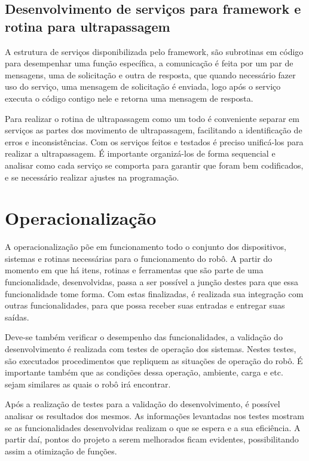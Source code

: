 \subsection{Desenvolvimento de serviços para framework e rotina para ultrapassagem}
\label{ssec:serv_ultr}
A estrutura de serviços disponibilizada pelo framework, são subrotinas em código para desempenhar uma função específica, a comunicação é feita por um par de mensagens, uma de solicitação e outra de resposta, que quando necessário fazer uso do serviço, uma mensagem de solicitação é enviada, logo após o serviço executa o código contigo nele e retorna uma mensagem de resposta. 

Para realizar o rotina de ultrapassagem como um todo é conveniente separar em serviços as partes dos movimento de ultrapassagem, facilitando a identificação de erros e inconsistências. Com os serviços feitos e testados é preciso unificá-los para realizar a ultrapassagem. É importante organizá-los de forma sequencial e analisar como cada serviço se comporta para garantir que foram bem codificados, e se necessário realizar ajustes na programação. 

\section{Operacionalização}
\label{sec:operal}
A operacionalização põe em funcionamento todo o conjunto dos dispositivos, sistemas e rotinas necessárias para o funcionamento do robô. A partir do momento em que há itens, rotinas e ferramentas que são parte de uma funcionalidade, desenvolvidas, passa a ser possível a junção destes para que essa funcionalidade tome forma. Com estas finalizadas, é realizada sua integração com outras funcionalidades, para que possa receber suas entradas e entregar suas saídas.

Deve-se também verificar o desempenho das funcionalidades, a validação do desenvolvimento é realizada com testes de operação dos sistemas. Nestes testes, são executados procedimentos que repliquem as situações de operação do robô. É importante também que as condições dessa operação, ambiente, carga e etc. sejam similares as quais o robô irá encontrar.

Após a realização de testes para a validação do desenvolvimento, é possível analisar os resultados dos mesmos. As informações levantadas nos testes mostram se as funcionalidades desenvolvidas realizam o que se espera e a sua eficiência. A partir daí, pontos do projeto a serem melhorados ficam evidentes, possibilitando assim a otimização de funções.

